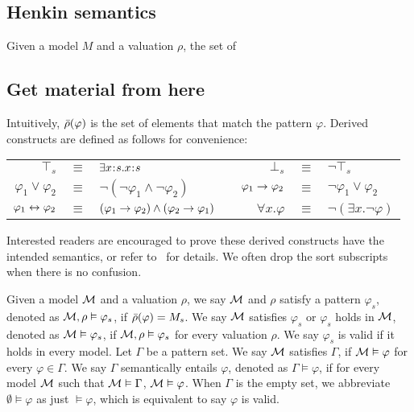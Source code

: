 \documentclass{amsart}
\begin{document}
\subsection{Henkin semantics}

\begin{definition}
Given a model $M$ and a valuation $\rho$, the set of 
\end{definition}

\subsection{Get material from here}
Intuitively,
$\bar{\rho}(\varphi)$ 
is the set of elements that match the pattern $\varphi$.
Derived constructs are defined as follows for convenience:
\begin{center}
\begin{tabular}{rclp{1cm}rcl}
$\top_s$ & $\equiv$ & $\exists x \mathbin{\!:\!} s . x \mathbin{\!:\!} s$
&&
$\bot_s$ & $\equiv$ & $\neg \top_s$
\\
$\varphi_1 \vee \varphi_2$ & $\equiv$ & 
$\neg (\neg \varphi_1 \wedge \neg \varphi_2)$
&&
$\varphi_1 \to \varphi_2$ & $\equiv$ &
$\neg \varphi_1 \vee \varphi_2$
\\
$\varphi_1 \leftrightarrow \varphi_2$ & $\equiv$ &
$(\varphi_1 \to \varphi_2) \wedge (\varphi_2 \to \varphi_1)$
&&
$\forall x . \varphi$ & $\equiv$ &
$\neg (\exists x . \neg \varphi)$
\end{tabular}
\end{center}
Interested readers are encouraged to prove these derived constructs
have the intended semantics,
or refer to~\cite{bibid} for details.
We often drop the sort subscripts when there is no confusion.

Given a model $\mathcal{M}$ and a valuation $\rho$,
we say $\mathcal{M}$ and $\rho$ satisfy a pattern $\varphi_s$,
denoted as $\mathcal{M},\rho \vDash \varphi_s$,
if $\bar{\rho}(\varphi) = M_s$.
We say $\mathcal{M}$ satisfies $\varphi_s$
or $\varphi_s$ holds in $\mathcal{M}$,
denoted as $\mathcal{M} \vDash \varphi_s$,
if $\mathcal{M} , \rho \vDash \varphi_s$ for every valuation $\rho$.
We say $\varphi_s$ is valid if
it holds in every model.
Let $\Gamma$ be a pattern set.
We say $\mathcal{M}$ satisfies $\Gamma$, if
$\mathcal{M} \vDash \varphi$ for every $\varphi \in \Gamma$.
We say $\Gamma$ semantically entails $\varphi$,
denoted as $\Gamma \vDash \varphi$,
if for every model $\mathcal{M}$ such that $\mathcal{M} \vDash \Gamma$,
$\mathcal{M} \vDash \varphi$.
When $\Gamma$ is the empty set, we abbreviate
$\emptyset \vDash \varphi$ as just $\vDash \varphi$,
which is equivalent to say $\varphi$ is valid.
\end{document}
